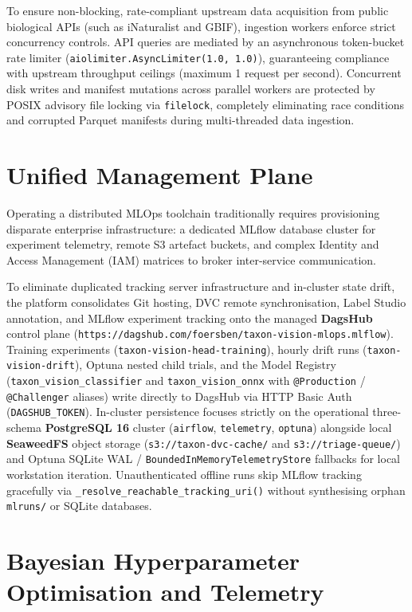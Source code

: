 To ensure non-blocking, rate-compliant upstream data acquisition from public biological APIs (such as iNaturalist and GBIF), ingestion workers enforce strict concurrency controls. API queries are mediated by an asynchronous token-bucket rate limiter (\texttt{aiolimiter.AsyncLimiter(1.0, 1.0)}), guaranteeing compliance with upstream throughput ceilings (maximum 1 request per second). Concurrent disk writes and manifest mutations across parallel workers are protected by POSIX advisory file locking via \texttt{filelock}, completely eliminating race conditions and corrupted Parquet manifests during multi-threaded data ingestion.

\section{Unified Management Plane}
\label{sec:dagshub}

Operating a distributed MLOps toolchain traditionally requires provisioning disparate enterprise infrastructure: a dedicated MLflow database cluster for experiment telemetry, remote S3 artefact buckets, and complex Identity and Access Management (IAM) matrices to broker inter-service communication.

To eliminate duplicated tracking server infrastructure and in-cluster state drift, the platform consolidates Git hosting, DVC remote synchronisation, Label Studio annotation, and MLflow experiment tracking onto the managed \textbf{DagsHub} control plane (\nolinkurl{https://dagshub.com/foersben/taxon-vision-mlops.mlflow}). Training experiments (\texttt{taxon-vision-head-training}), hourly drift runs (\texttt{taxon-vision-drift}), Optuna nested child trials, and the Model Registry (\texttt{taxon\_vision\_classifier} and \texttt{taxon\_vision\_onnx} with \texttt{@Production} / \texttt{@Challenger} aliases) write directly to DagsHub via HTTP Basic Auth (\texttt{DAGSHUB\_TOKEN}). In-cluster persistence focuses strictly on the operational three-schema \textbf{PostgreSQL 16} cluster (\texttt{airflow}, \texttt{telemetry}, \texttt{optuna}) alongside local \textbf{SeaweedFS} object storage (\texttt{s3://taxon-dvc-cache/} and \texttt{s3://triage-queue/}) and Optuna SQLite WAL / \texttt{BoundedInMemoryTelemetryStore} fallbacks for local workstation iteration. Unauthenticated offline runs skip MLflow tracking gracefully via \nolinkurl{_resolve_reachable_tracking_uri()} without synthesising orphan \nolinkurl{mlruns/} or SQLite databases.

\section{Bayesian Hyperparameter Optimisation and Telemetry}
\label{sec:hyperparameter_opt}

